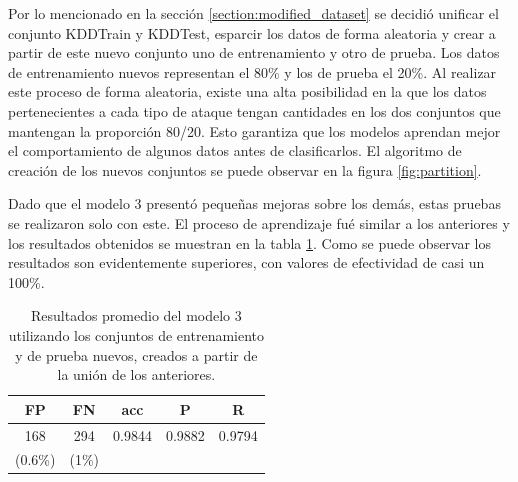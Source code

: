 Por lo mencionado en la sección \ref{section:modified_dataset} se decidió unificar el conjunto KDDTrain y KDDTest, esparcir los datos de forma aleatoria y crear a partir de este nuevo conjunto uno de entrenamiento y otro de prueba. Los datos de entrenamiento nuevos representan el 80\% y los de prueba el 20\%. Al realizar este proceso de forma aleatoria, existe una alta posibilidad en la que los datos pertenecientes a cada tipo de ataque tengan cantidades en los dos conjuntos que mantengan la proporción 80/20. Esto garantiza que los modelos aprendan mejor el comportamiento de algunos datos antes de clasificarlos. El algoritmo de creación de los nuevos conjuntos se puede observar en la figura \ref{fig:partition}.

Dado que el modelo 3 presentó pequeñas mejoras sobre los demás, estas pruebas se realizaron solo con este. El proceso de aprendizaje fué similar a los anteriores y los resultados obtenidos se muestran en la tabla \ref{tab:newdataset_results}. Como se puede observar los resultados son evidentemente superiores, con valores de efectividad de casi un 100\%.

\begin{table}[t]
    \begin{center}
        \label{tab:newdataset_results}
        \begin{tabular}{c|c|c|c|c} %
        \textbf{FP} & \textbf{FN} & \textbf{acc} & \textbf{P} & \textbf{R}\\
        \hline
        168 & 294 & 0.9844 & 0.9882 & 0.9794\\
        (0.6\%) & (1\%) &&&\\
        \end{tabular}

        \caption{Resultados promedio del modelo 3 utilizando los conjuntos de entrenamiento y de prueba nuevos, creados a partir de la unión de los anteriores.}
    \end{center}
\end{table}


